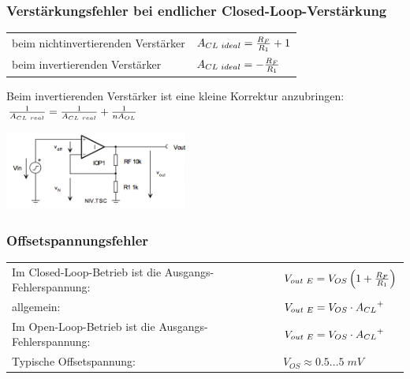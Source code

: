 		\subsubsection{Verstärkungsfehler bei endlicher Closed-Loop-Verstärkung}
			\begin{minipage}{12cm}
				\begin{tabular}{ll}
               	beim nichtinvertierenden Verstärker &
               	$A_{CL \hspace{1mm} ideal}=\frac{R_F}{R_1}+1$\\
               	beim invertierenden Verstärker &
                $A_{CL \hspace{1mm}
               	ideal}=-\frac{R_F}{R_1}$\\
         \end{tabular}
               	Beim invertierenden Verstärker ist eine kleine Korrektur
               	anzubringen: \\
               	$\frac{1}{A_{CL \hspace{1mm}
               	real}}=\frac{1}{A_{CL \hspace{1mm} real}}+\frac{1}{nA_{OL}}$\\
	        \end{minipage}
			\begin{minipage}{6cm}
               	\includegraphics[width=6cm]{./images/verstaerkungsfaktor.png}
            \end{minipage}
		\subsubsection{Offsetspannungsfehler}
				\begin{tabular}{ll}
					Im Closed-Loop-Betrieb ist die Ausgangs-Fehlerspannung: &
					$V_{out \hspace{1mm}E}=V_{OS}\left( 1+\frac{R_F}{R_1}\right)$\\
          allgemein: &
          $V_{out \hspace{1mm}E}=V_{OS} \cdot {A_{CL}}^{+}$\\
          Im Open-Loop-Betrieb ist die Ausgangs-Fehlerspannung: &
          $V_{out \hspace{1mm}E}=V_{OS}\cdot {A_{CL}}^{+}$\\
          Typische Offsetspannung: & $V_{OS} \approx 0.5 \dots 5 \; mV$
         \end{tabular}
		
